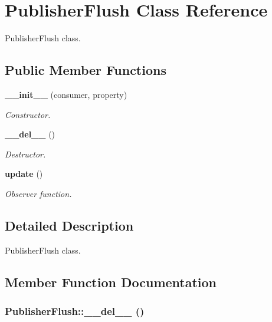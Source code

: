 \section{Publisher\-Flush Class Reference}
\label{classPublisherFlush}
Publisher\-Flush class.  


\subsection*{Public Member Functions}
\begin{CompactItemize}
\item 
{\bf \_\-\_\-init\_\-\_\-} (consumer, property)
\begin{CompactList}\small\item\em Constructor. \item\end{CompactList}\item 
{\bf \_\-\_\-del\_\-\_\-} ()
\begin{CompactList}\small\item\em Destructor. \item\end{CompactList}\item 
{\bf update} ()
\begin{CompactList}\small\item\em Observer function. \item\end{CompactList}\end{CompactItemize}


\subsection{Detailed Description}
Publisher\-Flush class. 



\subsection{Member Function Documentation}
\subsubsection{\setlength{\rightskip}{0pt plus 5cm}Publisher\-Flush::\_\-\_\-del\_\-\_\- ()}\label{classPublisherFlush_PublisherFlusha1}


